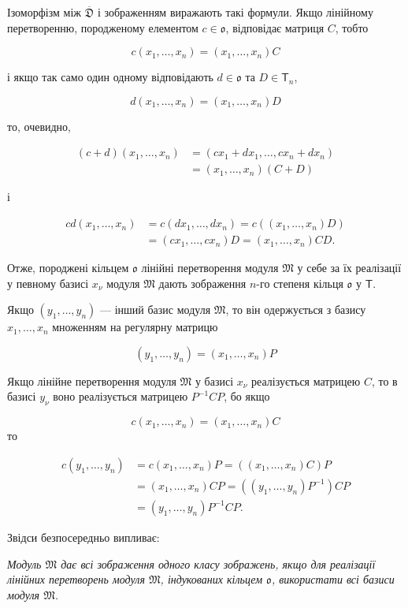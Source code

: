 \documentclass[11pt]{article}
\begin{document}
Ізоморфізм між \(\overline{\mathfrak D}\) і зображенням виражають такі формули. Якщо лінійному перетворенню, породженому елементом \(c\in\mathfrak{o}\), відповідає матриця \(C\), тобто

\[
c(x_1,\ldots,x_n)=(x_1,\ldots,x_n)C
\]

і якщо так само один одному відповідають \(d\in\mathfrak{o}\) та \(D\in\mathsf T_n\),

\[
d(x_1,\ldots,x_n)=(x_1,\ldots,x_n)D
\]

то, очевидно,

\[
\begin{aligned}
(c+d)(x_1,\ldots,x_n)
&=(cx_1+dx_1,\ldots,cx_n+dx_n)\\
&=(x_1,\ldots,x_n)(C+D)
\end{aligned}
\]

і

\[
\begin{aligned}
cd(x_1,\ldots,x_n)
&=c(dx_1,\ldots,dx_n)=c((x_1,\ldots,x_n)D)\\
&=(cx_1,\ldots,cx_n)D=(x_1,\ldots,x_n)CD.
\end{aligned}
\]

Отже, породжені кільцем \(\mathfrak{o}\) лінійні перетворення модуля \(\mathfrak M\) у себе за їх реалізації у певному базисі \(x_\nu\) модуля \(\mathfrak M\) дають зображення \(n\)-го степеня кільця \(\mathfrak{o}\) у \(\mathsf T\).

Якщо \((y_1,\ldots,y_n)\) --- інший базис модуля \(\mathfrak M\), то він одержується з базису \(x_1,\ldots,x_n\) множенням на регулярну матрицю

\[(y_1,\ldots,y_n)=(x_1,\ldots,x_n)P\]

Якщо лінійне перетворення модуля \(\mathfrak M\) у базисі \(x_\nu\) реалізується матрицею \(C\), то в базисі \(y_\nu\) воно реалізується матрицею \(P^{-1}CP\), бо якщо

\[c(x_1,\ldots,x_n)=(x_1,\ldots,x_n)C\]
то

\[
\begin{aligned}
c(y_1,\ldots,y_n)
&=c(x_1,\ldots,x_n)P=((x_1,\ldots,x_n)C)P\\
&=(x_1,\ldots,x_n)CP=((y_1,\ldots,y_n)P^{-1})CP\\
&=(y_1,\ldots,y_n)P^{-1}CP.
\end{aligned}
\]

Звідси безпосередньо випливає:

\emph{Модуль \(\mathfrak M\) дає всі зображення одного класу зображень, якщо для реалізації лінійних перетворень модуля \(\mathfrak M\), індукованих кільцем \(\mathfrak{o}\), використати всі базиси модуля \(\mathfrak M\).}
\end{document}
